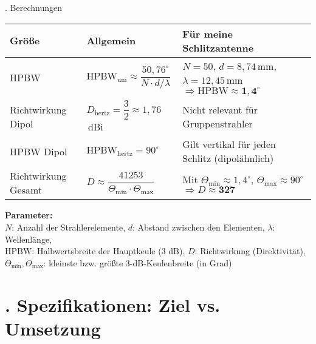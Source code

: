 \documentclass[
  aspectratio=169, %
]{beamer}
\begin{document}
\begin{frame}{\thesection. Berechnungen}
\footnotesize
\begin{tabular}{@{}p{}p{}p{}@{}}
\textbf{Größe} & \textbf{Allgemein} & \textbf{Für meine Schlitzantenne} \\
\midrule
HPBW & $\text{HPBW}_\text{uni} \approx \dfrac{50{,}76^\circ}{N \cdot d/\lambda}$ 
& $N = 50$, $d = 8{,}74$ mm, $\lambda = 12{,}45$ mm \newline
$\Rightarrow \text{HPBW} \approx \mathbf{1{,}4^\circ}$ \\
\midrule
Richtwirkung Dipol & $D_\text{hertz} = \dfrac{3}{2} \approx 1{,}76$ dBi 
& Nicht relevant für Gruppenstrahler \\
\midrule
HPBW Dipol & $\text{HPBW}_\text{hertz} = 90^\circ$ 
& Gilt vertikal für jeden Schlitz (dipolähnlich) \\
\midrule
Richtwirkung Gesamt & $\displaystyle D \approx \dfrac{41253}{\Theta_\text{min} \cdot \Theta_\text{max}}$ 
& Mit $\Theta_\text{min} \approx 1{,}4^\circ$, $\Theta_\text{max} \approx 90^\circ$ \newline
$\Rightarrow D \approx \mathbf{327}$ \\
\end{tabular}

\vspace{3mm}
\footnotesize
\textbf{Parameter:} \\
$N$: Anzahl der Strahlerelemente, \quad
$d$: Abstand zwischen den Elementen, \quad
$\lambda$: Wellenlänge, \\
$\text{HPBW}$: Halbwertsbreite der Hauptkeule (3 dB), \quad
$D$: Richtwirkung (Direktivität), \quad
$\Theta_\text{min}, \Theta_\text{max}$: kleinste bzw. größte 3-dB-Keulenbreite (in Grad)
\end{frame}

\section{\thesection. Spezifikationen: Ziel vs. Umsetzung}
\end{document}
